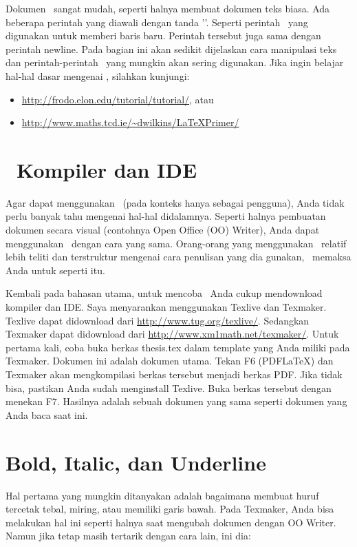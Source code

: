 	Dokumen \latex~sangat mudah, seperti halnya membuat dokumen teks biasa. Ada
	beberapa perintah yang diawali dengan tanda '\bslash'.
	Seperti perintah \bslash\bslash~yang digunakan untuk memberi baris baru.
	Perintah tersebut juga sama dengan perintah \bslash newline.
	Pada bagian ini akan sedikit dijelaskan cara manipulasi teks dan
	perintah-perintah \latex~yang mungkin akan sering digunakan.
	Jika ingin belajar hal-hal dasar mengenai \latex, silahkan kunjungi:

	\begin{itemize}
		\item \url{http://frodo.elon.edu/tutorial/tutorial/}, atau
		\item \url{http://www.maths.tcd.ie/~dwilkins/LaTeXPrimer/}
	\end{itemize}


	\section{\latex~Kompiler dan IDE}
	Agar dapat menggunakan \latex~(pada konteks hanya sebagai pengguna), Anda
	tidak perlu banyak tahu mengenai hal-hal didalamnya.
	Seperti halnya pembuatan dokumen secara visual (contohnya Open Office (OO)
	Writer), Anda dapat menggunakan \latex~dengan cara yang sama.
	Orang-orang yang menggunakan \latex~relatif lebih teliti dan terstruktur
	mengenai cara penulisan yang dia gunakan, \latex~memaksa Anda untuk seperti
	itu.

	Kembali pada bahasan utama, untuk mencoba \latex~Anda cukup mendownload
	kompiler dan IDE. Saya menyarankan menggunakan Texlive dan Texmaker.
	Texlive dapat didownload dari \url{http://www.tug.org/texlive/}.
	Sedangkan Texmaker dapat didownload dari
	\url{http://www.xm1math.net/texmaker/}.
	Untuk pertama kali, coba buka berkas thesis.tex dalam template yang Anda miliki
	pada Texmaker.
	Dokumen ini adalah dokumen utama.
	Tekan F6 (PDFLaTeX) dan Texmaker akan mengkompilasi berkas tersebut menjadi
	berkas PDF.
	Jika tidak bisa, pastikan Anda sudah menginstall Texlive.
	Buka berkas tersebut dengan menekan F7.
	Hasilnya adalah sebuah dokumen yang sama seperti dokumen yang Anda baca saat
	ini.


	\section{Bold, Italic, dan Underline}
	Hal pertama yang mungkin ditanyakan adalah bagaimana membuat huruf tercetak
	tebal, miring, atau memiliki garis bawah.
	Pada Texmaker, Anda bisa melakukan hal ini seperti halnya saat mengubah dokumen
	dengan OO Writer.
	Namun jika tetap masih tertarik dengan cara lain, ini dia:

